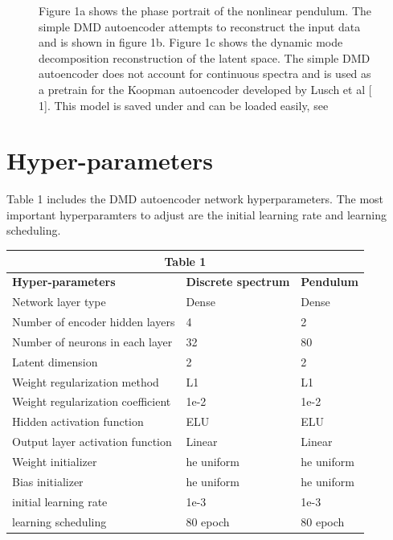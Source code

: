 \documentclass[twocolumn, letterpaper]{scrartcl}
\begin{document}
\begin{figure}[H]
        \vspace{-8pt}
        \caption{Figure 1a shows the phase portrait of the nonlinear pendulum. The simple DMD autoencoder attempts to reconstruct the input data and is shown in figure 1b. Figure 1c shows the dynamic mode decomposition reconstruction of the latent space. The simple DMD autoencoder does not account for continuous spectra and is used as a pretrain for the Koopman autoencoder developed by Lusch et al [{\color{blue} 1}]. This model is saved under  and can be loaded easily, see } 
    \end{figure}
    \vspace{-\intextsep}
        
\section*{\fontsize{15}{15} \textbf{Hyper-parameters}}
    Table 1 includes the DMD autoencoder network hyperparameters. The most important hyperparamters to adjust are the initial learning rate and learning scheduling. 
    \begin{tabular}{ |p{4cm}||p{2cm}|p{2cm}|  }
        \hline
         \multicolumn{3}{|c|}{Table 1} \\
         \hline
            \textbf{Hyper-parameters}  & \textbf{Discrete spectrum}  & \textbf{Pendulum} \\
            \hline
            Network layer type & Dense & Dense \\
            \hline
            Number of encoder hidden layers & 4 & 2 \\
            \hline
            Number of neurons in each layer & 32 & 80 \\
            \hline
            Latent dimension & 2 & 2 \\
            \hline
            Weight regularization method & L1 & L1 \\
            \hline 
            Weight regularization coefficient & 1e-2 & 1e-2\\
            \hline
            Hidden activation function & ELU & ELU\\
            \hline
            Output layer activation function & Linear & Linear\\
            \hline
            Weight initializer & he uniform & he uniform \\
            \hline
            Bias initializer & he uniform & he uniform \\
            \hline
            initial learning rate & 1e-3 & 1e-3 \\
            \hline 
            learning scheduling & 80 epoch & 80 epoch \\
        \hline 
    \end{tabular}
\end{document}
